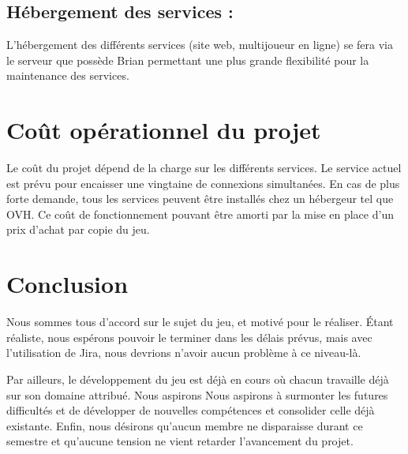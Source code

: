 \documentclass[a4paper,11pt]{article}
\begin{document}
\subsection{Hébergement des services :}
	
L'hébergement des différents services (site web, multijoueur en ligne) se fera via le serveur 
que possède Brian permettant une plus grande flexibilité pour la maintenance des services.



\section{Coût opérationnel du projet}

Le coût du projet dépend de la charge sur les différents services.
Le service actuel est prévu pour encaisser une vingtaine de connexions simultanées.
En cas de plus forte demande, tous les services peuvent être installés chez un hébergeur tel que OVH. 
Ce coût de fonctionnement pouvant être amorti par la mise en place d’un prix d’achat par copie du jeu.


\section{Conclusion}

Nous sommes tous d'accord sur le sujet du jeu, et motivé pour le réaliser. Étant réaliste, nous espérons pouvoir le terminer
dans les délais prévus, mais avec l'utilisation de Jira, nous devrions n'avoir aucun problème à ce niveau-là.

Par ailleurs, le développement du jeu est déjà en cours où chacun travaille déjà sur son domaine attribué. Nous aspirons
Nous aspirons à surmonter les futures difficultés et de développer de nouvelles compétences et consolider celle déjà existante.
Enfin, nous désirons qu'aucun membre ne disparaisse durant ce semestre et qu'aucune tension ne vient retarder l'avancement du projet.
\end{document}
